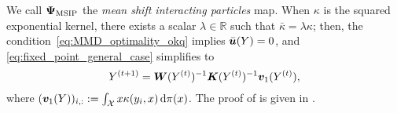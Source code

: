 We call $\bm{\Psi}_{\mathrm{MSIP}}$ the \textit{mean shift interacting particles} map. When $\kappa$ is the squared exponential kernel, there exists a scalar $\lambda \in \mathbb{R}$ such that $\bar{\kappa} = \lambda \kappa$; then, the condition~\eqref{eq:MMD_optimality_okq} implies $\bar{\bm{u}}(Y) = 0$, and \eqref{eq:fixed_point_general_case} simplifies to 
\begin{equation}
    Y^{(t+1)} = \bm{W}(Y^{(t)})^{-1} \bm{K}(Y^{(t)})^{-1} \bm{v}_{1}(Y^{(t)}),
\end{equation}
where $(\bm{v}_{1}(Y))_{i,:} :=  \int_{\mathcal{X}} x \kappa(y_{i},x)\,\mathrm{d}\pi(x)$.
The proof of  is given in .
 






